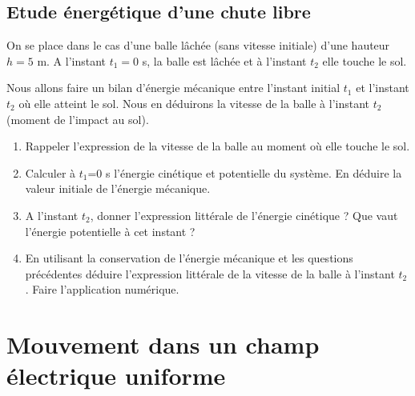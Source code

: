 \subsection{Etude énergétique d'une chute libre}
On se place dans le cas d'une balle lâchée (sans vitesse initiale)  d'une hauteur  $h=5$ m. A l'instant $t_1=0$ s, la balle est lâchée et à l'instant $t_2$ elle touche le sol.


Nous allons faire un bilan d'énergie mécanique entre l'instant initial $t_1$ et l'instant $t_2$ où elle atteint le sol. Nous en déduirons la vitesse de la balle à l'instant $t_2$ (moment de l'impact au sol).


\begin{enumerate}
\item Rappeler l'expression de la vitesse de la balle au moment où elle touche le sol.
\item Calculer à $t_1$=0 s l'énergie cinétique et potentielle du système. En déduire la valeur initiale de l'énergie mécanique.
\item A l'instant $t_2$, donner l'expression littérale de l'énergie cinétique ? Que vaut l'énergie potentielle à cet instant ?
\item En utilisant la conservation de l'énergie mécanique et les questions précédentes déduire l'expression littérale de la vitesse de la balle à l'instant $t_2$. Faire l'application numérique.
\end{enumerate}



\section{Mouvement dans un champ électrique uniforme}
